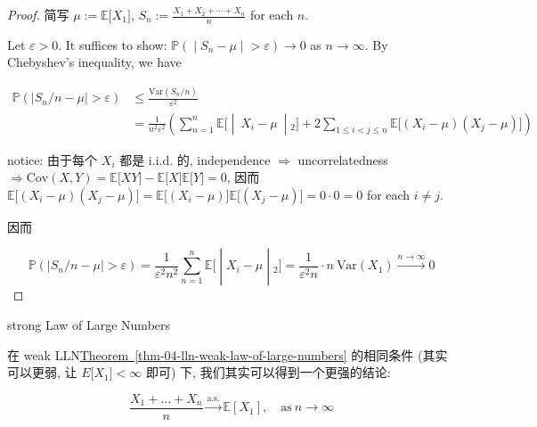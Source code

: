 \documentclass{qlnotes-export}
\begin{document}
\begin{proof}

简写 \(\mu := {\mathbb{E}}\lbrack X_{1}\rbrack\), \(S_{n} := \frac{X_{1} + X_{2} + \cdots + X_{n}}{n}\) for each \(n\).

Let \(\varepsilon > 0\). It suffices to show: \(\left. {\mathbb{P}}( \middle| S_{n} - \mu \middle| > \varepsilon)\rightarrow 0 \right.\) as \(n\rightarrow\infty\). By Chebyshev's inequality, we have

\[\begin{matrix}
{{\mathbb{P}}\left( {\left| {S_{n}/n - \mu} \right| > \varepsilon} \right)} & {\leq \frac{\text{Var}(S_{n}/n)}{\varepsilon^{2}}} \\
 & {= \frac{1}{n^{2}\varepsilon^{2}}\left( \sum\limits_{n = 1}^{n}{\mathbb{E}}\lbrack \middle| \ X_{i} - \mu\  \middle| {}_{2}\rbrack + 2\sum\limits_{1 \leq i < j \leq n}{\mathbb{E}}\lbrack(X_{i} - \mu)(X_{j} - \mu)\rbrack \right)}
\end{matrix}\]

notice: 由于每个 \(X_{i}\) 都是 i.i.d. 的, independence \(\Longrightarrow\) uncorrelatedness \(\Longrightarrow\text{Cov}(X,Y) = {\mathbb{E}}\lbrack XY\rbrack - {\mathbb{E}}\lbrack X\rbrack{\mathbb{E}}\lbrack Y\rbrack = 0\), 因而 \({\mathbb{E}}\lbrack(X_{i} - \mu)(X_{j} - \mu)\rbrack = {\mathbb{E}}\lbrack(X_{i} - \mu)\rbrack{\mathbb{E}}\lbrack(X_{j} - \mu)\rbrack = 0 \cdot 0 = 0\) for each \(i \neq j\).

因而

\[\left. {\mathbb{P}}\left( {\left| {S_{n}/n - \mu} \right| > \varepsilon} \right) = \frac{1}{\varepsilon^{2}n^{2}}\sum\limits_{n = 1}^{n}{\mathbb{E}}\lbrack \middle| X_{i} - \mu \middle| {}_{2}\rbrack = \frac{1}{\varepsilon^{2}n} \cdot n\ \text{Var}(X_{1})\overset{n\rightarrow\infty}{\rightarrow}0 \right.\]

\end{proof}

\begin{theorem}{strong Law of Large Numbers}\label{thm-04-lln-strong-law-of-large-numbers}

在 weak LLN\hyperref[thm-04-lln-weak-law-of-large-numbers]{Theorem~\ref*{thm-04-lln-weak-law-of-large-numbers}} 的相同条件 (其实可以更弱, 让 \(E\lbrack X_{1}\rbrack < \infty\) 即可) 下, 我们其实可以得到一个更强的结论:

\[\frac{X_{1} + \ldots + X_{n}}{n}\overset{\text{a.s.}}{\rightarrow}{\mathbb{E}}\left\lbrack X_{1} \right\rbrack,\quad\text{as}\ n\rightarrow\infty\]

\end{theorem}
\end{document}
